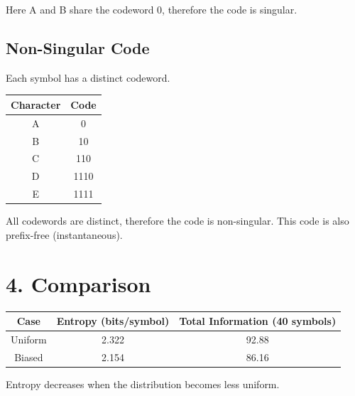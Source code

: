 \documentclass[12pt,oneside]{report}
\begin{document}
Here A and B share the codeword 0, therefore the code is singular.

\subsection*{Non-Singular Code}

Each symbol has a distinct codeword.

\begin{center}
\begin{tabular}{cc}
\toprule
Character & Code \\
\midrule
A & 0 \\
B & 10 \\
C & 110 \\
D & 1110 \\
E & 1111 \\
\bottomrule
\end{tabular}
\end{center}

All codewords are distinct, therefore the code is non-singular.
This code is also prefix-free (instantaneous).

\section*{4. Comparison}

\begin{center}
\begin{tabular}{ccc}
\toprule
Case & Entropy (bits/symbol) & Total Information (40 symbols) \\
\midrule
Uniform & 2.322 & 92.88 \\
Biased & 2.154 & 86.16 \\
\bottomrule
\end{tabular}
\end{center}

Entropy decreases when the distribution becomes less uniform.
\end{document}
